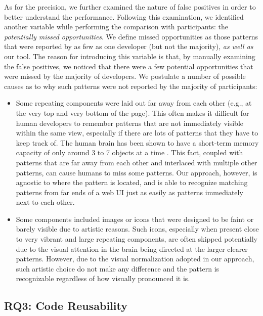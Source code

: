 As for the precision, we further examined the nature of false positives in order to better understand the performance.
Following this examination, we identified another variable while performing the comparison with participants: the \emph{potentially missed opportunities}.
We define missed opportunities as those patterns that were reported by as few as one developer (but not the majority), \emph{as well as} our tool.
The reason for introducing this variable is that, by manually examining the false positives,
we noticed that there were a few potential opportunities that were missed by the majority of developers.
We postulate a number of possible causes as to why such patterns were not reported by the majority of participants:

\begin{itemize}[leftmargin=*]
\item Some repeating components were laid out far away from each other (e.g., at the very top and very bottom of the page).
This often makes it difficult for human developers to remember patterns that are not immediately visible within the same view, especially if there are lots of patterns that they have to keep track of.
The human brain has been shown to have a short-term memory capacity of only around 3 to 7 objects at a time \cite{memory_limit_cowan_2001}. This fact, coupled with patterns that are far away from each other and interlaced with multiple other patterns, can cause humans to miss some patterns.
Our approach, however, is agnostic to where the pattern is located, and is able to recognize matching patterns from far ends of a web UI just as easily as patterns immediately next to each other.

\item Some components included images or icons that were designed to be faint or barely visible due to artistic reasons.
Such icons, especially when present close to very vibrant and large repeating components,
are often skipped potentially due to the visual attention in the brain being directed at the larger clearer patterns.
However, due to the visual normalization adopted in our approach, such artistic choice do not make any difference and the pattern is recognizable regardless of how visually pronounced it is.

\end{itemize}


\subsection{RQ3: Code Reusability}

